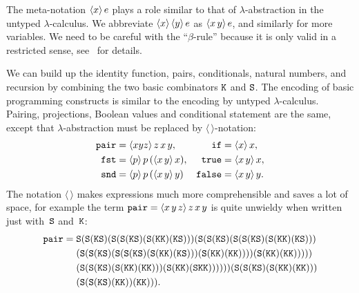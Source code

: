 The meta-notation $\langle x \rangle\, e$ plays a role similar to that of
$\lambda$-abstraction in the untyped $\lambda$-calculus. We abbreviate
$\langle x \rangle\, \langle y \rangle\, e$ as $\langle x\,y \rangle\, e$, and similarly for
more variables. We need to be careful with the ``$\beta$-rule''
because it is only valid in a restricted sense,
see~\cite{LongleyJ:reatls} for details.

We can build up the identity function, pairs, conditionals, natural numbers, and recursion by combining the two basic combinators $\mathtt{K}$ and $\mathtt{S}$. The encoding of basic programming constructs is similar to the encoding by untyped $\lambda$-calculus.
%
%
%
%
\label{sym:combPair}%
\label{sym:combFst}%
\label{sym:combSnd}%
%
Pairing, projections, Boolean values and conditional statement are the
same, except that $\lambda$-abstraction must be replaced by
$\langle\,\rangle$-notation:
%
\begin{align*}
  \mathtt{pair} &= \langle x y z \rangle\,{z\, x\, y},
  &
  \mathtt{if} &= \langle x \rangle\, x,
  \\
  \mathtt{fst} &= \langle p \rangle\,{p \, (\langle x\,y \rangle\, x)},
  &
  \mathtt{true} &= \langle x\,y \rangle\, x,
  \\
  \mathtt{snd} &= \langle p \rangle\,{p \, (\langle x\,y \rangle\, y)}
  &
  \mathtt{false} &= \langle x\,y \rangle\, y.
\end{align*}
%
The notation $\langle\,\rangle$ makes expressions much more
comprehensible and saves a lot of space, for example the term
$\mathtt{pair} = \langle x\,y\,z \rangle\,{z\, x\, y}$ is quite unwieldy when written
just with~$\mathtt{S}$ and~$\mathtt{K}$:
%
\begin{equation*}
  \mathtt{pair} =
  \begin{aligned}[t]
  & {\mathtt{S}} (
    {\mathtt{S}} ({\mathtt{K}}{\mathtt{S}}) (
      {\mathtt{S}}({\mathtt{S}}({\mathtt{K}}{\mathtt{S}})({\mathtt{S}}({\mathtt{K}}{\mathtt{K}})({\mathtt{K}}{\mathtt{S}}))) (
        {\mathtt{S}} (
          {\mathtt{S}} ({\mathtt{K}}{\mathtt{S}}) (
            {\mathtt{S}}({\mathtt{S}}({\mathtt{K}}{\mathtt{S}})({\mathtt{S}}({\mathtt{K}}{\mathtt{K}})({\mathtt{K}}{\mathtt{S}}))) \\ & (
              {\mathtt{S}}({\mathtt{S}}({\mathtt{K}}{\mathtt{S}})({\mathtt{S}}({\mathtt{S}}({\mathtt{K}}{\mathtt{S}})({\mathtt{S}}({\mathtt{K}}{\mathtt{K}})({\mathtt{K}}{\mathtt{S}})))({\mathtt{S}}({\mathtt{K}}{\mathtt{K}})({\mathtt{K}}{\mathtt{K}}))))(
              {\mathtt{S}}({\mathtt{K}}{\mathtt{K}})({\mathtt{K}}{\mathtt{K}}))
            )
          )
        ) \\ &
   (
          {\mathtt{S}}({\mathtt{S}}({\mathtt{K}}{\mathtt{S}})({\mathtt{S}}({\mathtt{K}}{\mathtt{K}})({\mathtt{K}}{\mathtt{K}})))({\mathtt{S}}({\mathtt{K}}{\mathtt{K}})({\mathtt{S}}{\mathtt{K}}{\mathtt{K}}))
          )
      )
    )
  ) (
    {\mathtt{S}}({\mathtt{S}}({\mathtt{K}}{\mathtt{S}})({\mathtt{S}}({\mathtt{K}}{\mathtt{K}})({\mathtt{K}}{\mathtt{K}}))) \\ & ({\mathtt{S}}({\mathtt{S}}({\mathtt{K}}{\mathtt{S}})({\mathtt{K}}{\mathtt{K}}))({\mathtt{K}}{\mathtt{K}}))
  ).
  \end{aligned}
\end{equation*}
